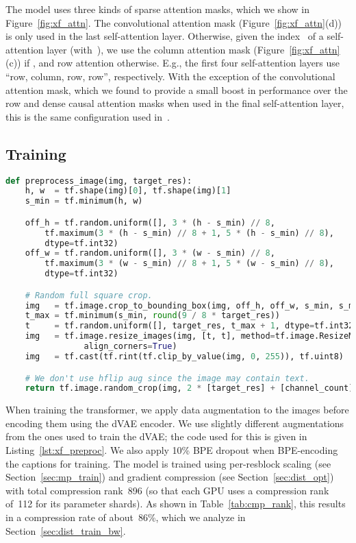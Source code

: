 \documentclass{article}
\begin{document}
The model uses three kinds of sparse attention masks, which we show in Figure~\ref{fig:xf_attn}. The convolutional attention mask (Figure~\ref{fig:xf_attn}(d)) is only used in the last self-attention layer. Otherwise, given the index~ of a self-attention layer (with~), we use the column attention mask (Figure~\ref{fig:xf_attn}(c)) if , and row attention otherwise. E.g., the first four self-attention layers use ``row, column, row, row'', respectively. With the exception of the convolutional attention mask, which we found to provide a small boost in performance over the row and dense causal attention masks when used in the final self-attention layer, this is the same configuration used in~\citet{child2019generating}.

\subsection{Training}
\label{sec:xf_train}
\begin{lstlisting}[language=Python,basicstyle=\footnotesize\ttfamily,caption={TensorFlow~\cite{abadi2016tensorflow} image preprocessing code for training the transformer. We use \texttt{target\_res = 256} and \texttt{channel\_count = 3}.},label={lst:xf_preproc},captionpos=b,float=tp,floatplacement=tbp]
def preprocess_image(img, target_res):
    h, w  = tf.shape(img)[0], tf.shape(img)[1]
    s_min = tf.minimum(h, w)

    off_h = tf.random.uniform([], 3 * (h - s_min) // 8,
        tf.maximum(3 * (h - s_min) // 8 + 1, 5 * (h - s_min) // 8),
        dtype=tf.int32)
    off_w = tf.random.uniform([], 3 * (w - s_min) // 8,
        tf.maximum(3 * (w - s_min) // 8 + 1, 5 * (w - s_min) // 8),
        dtype=tf.int32)

    # Random full square crop.
    img   = tf.image.crop_to_bounding_box(img, off_h, off_w, s_min, s_min)
    t_max = tf.minimum(s_min, round(9 / 8 * target_res))
    t     = tf.random.uniform([], target_res, t_max + 1, dtype=tf.int32)
    img   = tf.image.resize_images(img, [t, t], method=tf.image.ResizeMethod.AREA,
                align_corners=True)
    img   = tf.cast(tf.rint(tf.clip_by_value(img, 0, 255)), tf.uint8)

    # We don't use hflip aug since the image may contain text.
    return tf.image.random_crop(img, 2 * [target_res] + [channel_count])
\end{lstlisting}

When training the transformer, we apply data augmentation to the images before encoding them using the dVAE encoder. We use slightly different augmentations from the ones used to train the dVAE; the code used for this is given in Listing~\ref{lst:xf_preproc}. We also apply 10\% BPE dropout when BPE-encoding the captions for training. The model is trained using per-resblock scaling (see Section~\ref{sec:mp_train}) and gradient compression (see Section~\ref{sec:dist_opt}) with total compression rank~896 (so that each GPU uses a compression rank of~112 for its parameter shards). As shown in Table~\ref{tab:cmp_rank}, this results in a compression rate of about~86\%, which we analyze in Section~\ref{sec:dist_train_bw}.
\end{document}
